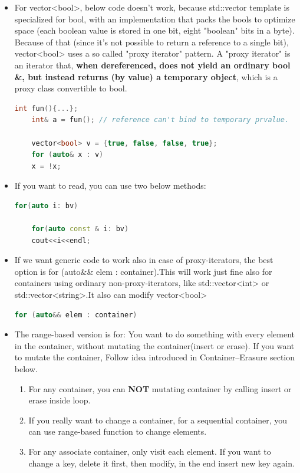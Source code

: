 \documentclass[a4paper,11pt,twoside]{book}
\begin{document}
\begin{itemize}
\begin{enumerate}
	\end{enumerate}
	
	
	\item For vector<bool>, below code doesn't work, because std::vector template is specialized for bool, with an implementation that packs the bools to optimize space (each boolean value is stored in one bit, eight "boolean" bits in a byte). Because of that (since it's not possible to return a reference to a single bit), vector<bool> uses a so called "proxy iterator" pattern. A "proxy iterator" is an iterator that, \textbf{when dereferenced, does not yield an ordinary bool \&, but instead returns (by value) a temporary object}, which is a proxy class convertible to bool. 
	\begin{lstlisting}[frame=single, language=c++]
	int fun(){...};
	int& a = fun(); // reference can't bind to temporary prvalue.
	
	vector<bool> v = {true, false, false, true};
	for (auto& x : v)
	x = !x;
	\end{lstlisting}
	
	\item If you want to read, you can use two below methods:
	\begin{lstlisting}[frame=single, language=c++]
	for(auto i: bv)
	
	for(auto const & i: bv)
	cout<<i<<endl;
	\end{lstlisting}
	
	\item If we want generic code to work also in case of proxy-iterators, the best option is for (auto\&\& elem : container).This will work just fine also for containers using ordinary non-proxy-iterators, like std::vector<int> or std::vector<string>.It also can modify vector<bool> 
	\begin{lstlisting}[frame=single, language=c++]
	for (auto&& elem : container)
	\end{lstlisting}
	
	\item The range-based version is for: You want to do something with every element in the container, without mutating the container(insert or erase). If you want to mutate the container, Follow idea introduced in Container--Erasure section below.
	
	\begin{enumerate}
		\item For any container, you can \textbf{NOT} mutating container by calling insert or erase inside loop.
		\item If you really want to change a container, for a sequential container, you can use range-based function to change elements. 
		\item For any associate container, only visit each element. If you want to change a key, delete it first, then modify, in the end insert new key again. 
	\end{enumerate}
	
\end{itemize}
\end{document}
